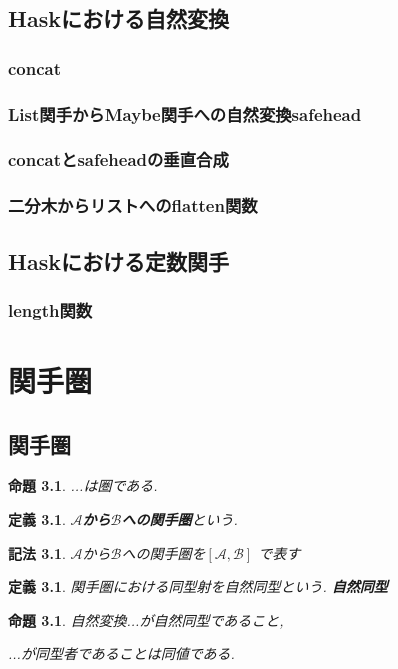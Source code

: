\documentclass[dvipdfmx]{jsbook}
\theoremstyle{plain}
\newtheorem{Def}[thm]{定義}
\newtheorem{Notation}[thm]{記法}
\newtheorem{Prop}[thm]{命題}
\begin{document}
\section{Haskにおける自然変換}
\subsection{concat}
\subsection{List関手からMaybe関手への自然変換safehead}
\subsection{concatとsafeheadの垂直合成}
\subsection{二分木からリストへのflatten関数}

\section{Haskにおける定数関手}
\subsection{length関数}

\chapter{関手圏}
\section{関手圏}
\begin{Prop}
...は圏である.
\end{Prop}
\begin{Def}
{\bf $\mathscr{A}$から$\mathscr{B}$への関手圏}という.
\end{Def}
\begin{Notation}
$\mathscr{A}$から$\mathscr{B}$への関手圏を$[\mathscr{A},\mathscr{B}]$
で表す\end{Notation}
\begin{Def}
関手圏における同型射を自然同型という.
\bf{自然同型}
\end{Def}
\begin{Prop}
自然変換...が自然同型であること,

...が同型者であることは同値である.
\end{Prop}
\end{document}
